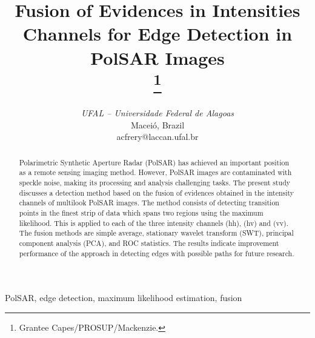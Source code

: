 \documentclass[conference]{IEEEtran}
\begin{document}
\title{Fusion of Evidences in Intensities Channels for Edge Detection in PolSAR Images\\
\thanks{Grantee Capes/PROSUP/Mackenzie.}
}
\author{
\and
{}
\and
{}
\textit{UFAL -- Universidade Federal de Alagoas}\\
Maceió, Brazil \\
acfrery@laccan.ufal.br}
\maketitle
\begin{abstract}
Polarimetric Synthetic Aperture Radar (PolSAR) has achieved an important position as a remote sensing imaging method. 
However, PolSAR images are contaminated with speckle noise, making its processing and analysis challenging tasks. 
The present study discusses a detection method based on the fusion of evidences obtained in the intensity channels of multilook PolSAR images.
The method consists of detecting transition points in the finest strip of data which spans two regions using the maximum likelihood.
This is applied to each of the three intensity channels (hh), (hv) and (vv). 
The fusion methods are simple average, stationary wavelet transform (SWT), principal component analysis (PCA), and ROC statistics.  
The results indicate improvement performance of the approach in detecting edges with possible paths for future research.
\end{abstract}

\begin{IEEEkeywords}
PolSAR, edge detection, maximum likelihood estimation, fusion
\end{IEEEkeywords}
\end{document}
